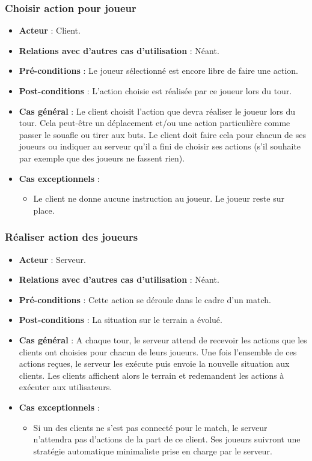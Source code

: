 \documentclass[a4paper,titlepage]{scrreprt}
\begin{document}
    \subsubsection{Choisir action pour joueur}
      \begin{itemize}
        \item \textbf{Acteur}  : Client.
        \item \textbf{Relations avec d'autres cas d'utilisation}  : Néant.
        \item \textbf{Pré-conditions} : Le joueur sélectionné est encore libre de faire une action.
        \item \textbf{Post-conditions} : L'action choisie est réalisée par ce joueur lors du tour.
        \item \textbf{Cas général} : Le client choisit l'action que devra réaliser le joueur lors du tour. Cela peut-être un déplacement et/ou une action particulière comme passer le souafle ou tirer aux buts. Le client doit faire cela pour chacun de ses joueurs ou indiquer au serveur qu’il a fini de choisir ses actions (s’il souhaite par exemple que des joueurs ne fassent rien).
        \item \textbf{Cas exceptionnels} : 
        \begin{itemize}
         \item Le client ne donne aucune instruction au joueur. Le joueur reste sur place.
        \end{itemize}
      \end{itemize}
    \subsubsection{Réaliser action des joueurs}
      \begin{itemize}
        \item \textbf{Acteur}  : Serveur.
        \item \textbf{Relations avec d'autres cas d'utilisation}  : Néant.
        \item \textbf{Pré-conditions} : Cette action se déroule dans le cadre d'un match.
        \item \textbf{Post-conditions} : La situation sur le terrain a évolué.
        \item \textbf{Cas général} : A chaque tour, le serveur attend de recevoir les actions que les clients ont choisies pour chacun de leurs joueurs. Une fois l’ensemble de ces actions reçues, le serveur les exécute puis envoie la nouvelle situation aux clients. Les clients affichent alors le terrain et redemandent les actions à exécuter aux utilisateurs.
        \item \textbf{Cas exceptionnels} : 
          \begin{itemize}
            \item Si un des clients ne s’est pas connecté pour le match, le serveur n’attendra pas d’actions de la part de ce client. Ses joueurs suivront une stratégie automatique minimaliste prise en charge par le serveur.
          \end{itemize}  
      \end{itemize}
\end{document}
